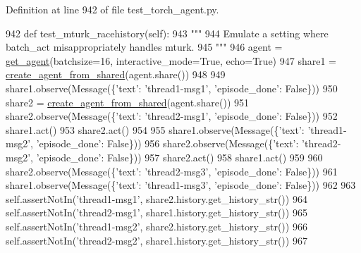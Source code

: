 Definition at line 942 of file test\+\_\+torch\+\_\+agent.\+py.


\begin{DoxyCode}
942     \textcolor{keyword}{def }test\_mturk\_racehistory(self):
943         \textcolor{stringliteral}{"""}
944 \textcolor{stringliteral}{        Emulate a setting where batch\_act misappropriately handles mturk.}
945 \textcolor{stringliteral}{        """}
946         agent = \hyperlink{namespacetests_1_1test__torch__agent_ae929d109305aaea29fbfa13ecf1f32e9}{get\_agent}(batchsize=16, interactive\_mode=\textcolor{keyword}{True}, echo=\textcolor{keyword}{True})
947         share1 = \hyperlink{namespaceparlai_1_1core_1_1agents_aa5af5dd1d2f9da491b60348d479b849f}{create\_agent\_from\_shared}(agent.share())
948 
949         share1.observe(Message(\{\textcolor{stringliteral}{'text'}: \textcolor{stringliteral}{'thread1-msg1'}, \textcolor{stringliteral}{'episode\_done'}: \textcolor{keyword}{False}\}))
950         share2 = \hyperlink{namespaceparlai_1_1core_1_1agents_aa5af5dd1d2f9da491b60348d479b849f}{create\_agent\_from\_shared}(agent.share())
951         share2.observe(Message(\{\textcolor{stringliteral}{'text'}: \textcolor{stringliteral}{'thread2-msg1'}, \textcolor{stringliteral}{'episode\_done'}: \textcolor{keyword}{False}\}))
952         share1.act()
953         share2.act()
954 
955         share1.observe(Message(\{\textcolor{stringliteral}{'text'}: \textcolor{stringliteral}{'thread1-msg2'}, \textcolor{stringliteral}{'episode\_done'}: \textcolor{keyword}{False}\}))
956         share2.observe(Message(\{\textcolor{stringliteral}{'text'}: \textcolor{stringliteral}{'thread2-msg2'}, \textcolor{stringliteral}{'episode\_done'}: \textcolor{keyword}{False}\}))
957         share2.act()
958         share1.act()
959 
960         share2.observe(Message(\{\textcolor{stringliteral}{'text'}: \textcolor{stringliteral}{'thread2-msg3'}, \textcolor{stringliteral}{'episode\_done'}: \textcolor{keyword}{False}\}))
961         share1.observe(Message(\{\textcolor{stringliteral}{'text'}: \textcolor{stringliteral}{'thread1-msg3'}, \textcolor{stringliteral}{'episode\_done'}: \textcolor{keyword}{False}\}))
962 
963         self.assertNotIn(\textcolor{stringliteral}{'thread1-msg1'}, share2.history.get\_history\_str())
964         self.assertNotIn(\textcolor{stringliteral}{'thread2-msg1'}, share1.history.get\_history\_str())
965         self.assertNotIn(\textcolor{stringliteral}{'thread1-msg2'}, share2.history.get\_history\_str())
966         self.assertNotIn(\textcolor{stringliteral}{'thread2-msg2'}, share1.history.get\_history\_str())
967 
\end{DoxyCode}
\mbox{\label{classtests_1_1test__torch__agent_1_1TestTorchAgent_ae3b6e4145176ba5d5e9179756d064332}} 
